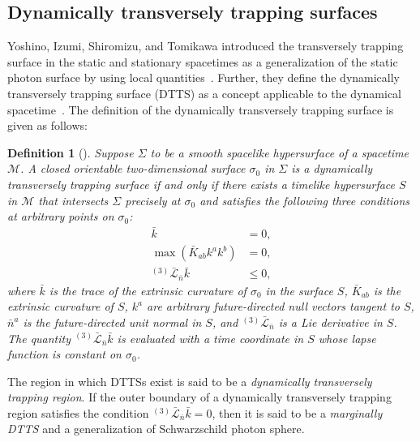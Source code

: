 \documentclass[prd,showpacs,preprintnumbers,groupedaddress,superscriptaddress,nofootinbib,11pt]{revtex4-1} %
\theoremstyle{newplain}
\newtheorem{definition}{Definition}
\begin{document}
\subsection{Dynamically transversely trapping surfaces}
Yoshino, Izumi, Shiromizu, and Tomikawa introduced the transversely trapping surface in the static and stationary spacetimes as a generalization of the static photon surface by using local quantities~\cite{yoshino_tts}.
Further, they define the dynamically transversely trapping surface (DTTS) as a concept applicable to the dynamical spacetime~\cite{yoshino_dtts}.
The definition of the dynamically transversely trapping surface is given as follows:
\begin{definition}[\cite{yoshino_dtts}]
Suppose $\Sigma$ to be a smooth spacelike hypersurface of a spacetime $\mathcal{M}$.
A closed orientable two-dimensional surface $\sigma_0$ in $\Sigma$ is
a dynamically transversely trapping surface if and only if
there exists a timelike hypersurface $S$ in $\mathcal{M}$
that intersects $\Sigma$ precisely at $\sigma_0$
and satisfies the following three conditions at arbitrary points on $\sigma_0$:
\begin{align}
  \bar{k} &=0,
  \\
  \max \left( \bar{K}_{a b} k^{a} k^{b} \right) & = 0 ,
  \\ ^{(3)}\bar{\mathcal{L}}_{\bar{n}} \bar{k} &\leq 0,
\end{align}
where $\bar{k}$ is the trace of the extrinsic curvature of $\sigma_0$ in the surface $S$, $\bar{K}_{a b}$ is the extrinsic curvature of $S$, $k^a$ are arbitrary future-directed null vectors tangent to $S$, $\bar{n}^a$ is the future-directed unit normal in $S$, and $^{(3)}\bar{\mathcal{L}}_{\bar{n}}$ is a Lie derivative in $S$.
The quantity $^{(3)}\bar{\mathcal{L}}_{\bar{n}}\bar{k}$ is evaluated with a time coordinate in $S$ whose lapse function is constant on $\sigma_0$.
\label{DTTS}
\end{definition}
\noindent
The region in which DTTSs exist is said to be a {\itshape dynamically transversely trapping region}.
If the outer boundary of a dynamically transversely trapping region satisfies the condition $^{(3)}\bar{\mathcal{L}}_{\bar{n}} \bar{k} = 0$, then it is said to be a {\itshape marginally DTTS} and a generalization of Schwarzschild photon sphere.
\end{document}

